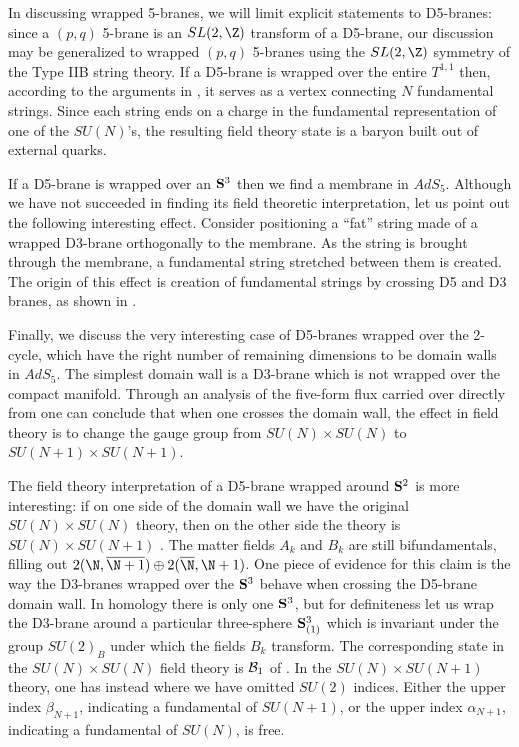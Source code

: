 In discussing wrapped 5-branes, we will limit explicit statements
to D5-branes: since a $(p,q)$ 5-brane is an $SL(2,\Z)$
transform of a D5-brane, our discussion may be 
generalized to wrapped $(p,q)$ 5-branes using the $SL(2,\Z)$
symmetry of the Type IIB string theory.
If a D5-brane is wrapped over the entire $T^{1,1}$ then, according to
the arguments in \cite{Ed,GO}, it serves as a vertex connecting $N$
fundamental strings. Since each string ends on a charge in the
fundamental representation of one of the $SU(N)$'s, the resulting
field theory state is a baryon built out of external quarks.

If a
D5-brane is wrapped over an ${\bf S}^3$ then we find a membrane in
$AdS_5$. Although we have not succeeded in finding its field theoretic
interpretation, let us point out the following interesting effect.
Consider positioning a ``fat'' string made of a wrapped D3-brane
orthogonally to the membrane. As the string is brought through the
membrane, a fundamental string 
stretched between them 
is created. The origin of this effect
is creation of fundamental strings by crossing D5
and D3 branes, as shown in \cite{bdg,dfk}.

Finally, we discuss the very interesting case of D5-branes wrapped
over the 2-cycle, which have the right number of remaining dimensions
to be domain walls in $AdS_5$. The simplest domain wall is 
a D3-brane which is not wrapped over the compact manifold.
Through an analysis of the five-form flux carried over
directly from \cite{Ed} one can conclude that when one crosses the
domain wall, the effect in field theory is to change the gauge group
from $SU(N) \times SU(N)$ to $SU(N+1) \times SU(N+1)$.

The field theory interpretation of a D5-brane wrapped around ${\bf S}^2$ is
more interesting:  
if
on one side of the domain wall we have the original $SU(N) \times
SU(N)$ theory, then on the other side the theory is
$SU(N) \times SU(N+1)$ \cite{GK}.  
The matter fields $A_k$ and $B_k$ are still
bifundamentals, filling out $2 (\N,\overline{\N+1}) \oplus 2
(\overline{\N}, \N+1)$.  
One piece of evidence for this claim
is the way the D3-branes wrapped over the ${\bf S}^3$
behave when crossing the D5-brane domain wall.
In homology there is only one ${\bf S}^3$, but for
definiteness let us wrap the D3-brane around a particular three-sphere
${\bf S}^3_{(1)}$ which is invariant under the group $SU(2)_B$ under which
the fields $B_k$ transform.  The corresponding state in the $SU(N)
\times SU(N)$ field theory is ${\cal B}_1$ of .  In the
$SU(N) \times SU(N+1)$ theory, one has instead
 where we have omitted $SU(2)$ indices.  Either the upper index
$\beta_{N+1}$, indicating a fundamental of $SU(N+1)$, or the upper
index $\alpha_{N+1}$, indicating a fundamental of $SU(N)$, is free.

